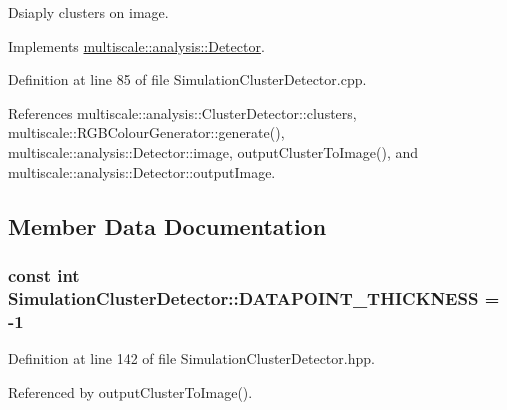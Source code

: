 \-Dsiaply clusters on image. 



\-Implements \hyperlink{classmultiscale_1_1analysis_1_1Detector_a5d10b68605d5a1711527b4b896b3b2cc}{multiscale\-::analysis\-::\-Detector}.



\-Definition at line 85 of file \-Simulation\-Cluster\-Detector.\-cpp.



\-References multiscale\-::analysis\-::\-Cluster\-Detector\-::clusters, multiscale\-::\-R\-G\-B\-Colour\-Generator\-::generate(), multiscale\-::analysis\-::\-Detector\-::image, output\-Cluster\-To\-Image(), and multiscale\-::analysis\-::\-Detector\-::output\-Image.



\subsection{\-Member \-Data \-Documentation}
\hypertarget{classmultiscale_1_1analysis_1_1SimulationClusterDetector_a530922a3fad1e612062d17d07e2dc763}{
\subsubsection[{\-D\-A\-T\-A\-P\-O\-I\-N\-T\-\_\-\-T\-H\-I\-C\-K\-N\-E\-S\-S}]{\setlength{\rightskip}{0pt plus 5cm}const int {\bf \-Simulation\-Cluster\-Detector\-::\-D\-A\-T\-A\-P\-O\-I\-N\-T\-\_\-\-T\-H\-I\-C\-K\-N\-E\-S\-S} = -\/1}}\label{classmultiscale_1_1analysis_1_1SimulationClusterDetector_a530922a3fad1e612062d17d07e2dc763}


\-Definition at line 142 of file \-Simulation\-Cluster\-Detector.\-hpp.



\-Referenced by output\-Cluster\-To\-Image().

